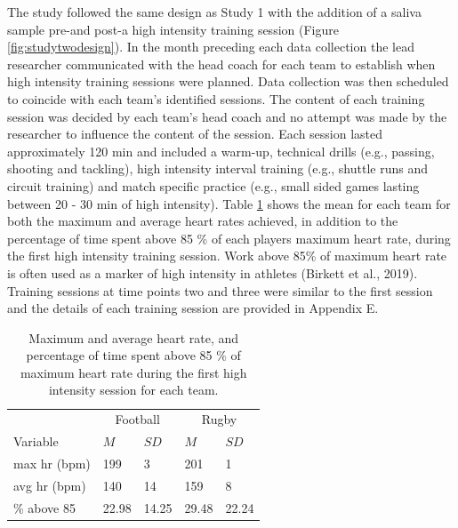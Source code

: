 \documentclass[man,floatsintext]{apa6}
\begin{document}
The study followed the same design as Study 1 with the addition of a saliva sample pre-and post-a high intensity training session (Figure \ref{fig:studytwodesign}).
In the month preceding each data collection the lead researcher communicated with the head coach for each team to establish when high intensity training sessions were planned.
Data collection was then scheduled to coincide with each team's identified sessions.
The content of each training session was decided by each team's head coach and no attempt was made by the researcher to influence the content of the session.
Each session lasted approximately 120 min and included a warm-up, technical drills (e.g., passing, shooting and tackling), high intensity interval training (e.g., shuttle runs and circuit training) and match specific practice (e.g., small sided games lasting between 20 - 30 min of high intensity).
Table \ref{tab:hrdata} shows the mean for each team for both the maximum and average heart rates achieved, in addition to the percentage of time spent above 85 \% of each players maximum heart rate, during the first high intensity training session.
Work above 85\% of maximum heart rate is often used as a marker of high intensity in athletes (Birkett et al., 2019).
Training sessions at time points two and three were similar to the first session and the details of each training session are provided in Appendix E.

\begin{table}[H]

\begin{center}
\begin{threeparttable}

\caption{\label{tab:hrdata}Maximum and average heart rate, and percentage of time spent above 85 \% of maximum heart rate during the first high intensity session for each team.}

\begin{tabular}{lllll}
\toprule
 & \multicolumn{2}{c}{Football} & \multicolumn{2}{c}{Rugby} \\
\cmidrule(r){2-3} \cmidrule(r){4-5}
Variable & $M$ & $SD$ & $M$ & $SD$\\
\midrule
max hr (bpm) & 199 & 3 & 201 & 1\\
avg hr (bpm) & 140 & 14 & 159 & 8\\
\% above 85 & 22.98 & 14.25 & 29.48 & 22.24\\
\bottomrule
\end{tabular}

\end{threeparttable}
\end{center}

\end{table}
\end{document}

